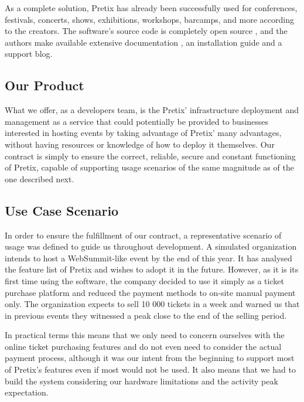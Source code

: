 \documentclass[12pt]{article}
\begin{document}
As a complete solution, Pretix has already been successfully used for conferences, festivals, concerts, shows, exhibitions, workshops, barcamps, and more 
according to the creators.
The software's source code is completely open source \cite{pretixgit}, and the authors make available extensive documentation \cite{pretixdoc}, an installation 
guide and a support blog.

\subsection{Our Product} \label{pretix.product} %


What we offer, as a developers team, is the Pretix' infrastructure deployment and management as a service that could potentially be provided to businesses 
interested in hosting events by taking advantage of Pretix' many advantages, without having resources or knowledge of how to deploy it themselves.
Our contract is simply to ensure the correct, reliable, secure and constant functioning of Pretix, capable of supporting usage scenarios of the same magnitude 
as of the one described next.

\subsection{Use Case Scenario} \label{pretix.scenario} %


In order to ensure the fulfillment of our contract, a representative scenario of usage was defined to guide us throughout development.
A simulated organization intends to host a WebSummit-like event by the end of this year.
It has analysed the feature list of Pretix and wishes to adopt it in the future.
However, as it is its first time using the software, the company decided to use it simply as a ticket purchase platform and reduced the payment methods to 
on-site manual payment only. %
The organization expects to sell 10 000 tickets in a week and warned us that in previous events they witnessed a peak close to the end of the selling period.

In practical terms this means that we only need to concern ourselves with the online ticket purchasing features and do not even need to consider the actual 
payment process, although it was our intent from the beginning to support most of Pretix's features even if most would not be used.
It also means that we had to build the system considering our hardware limitations and the activity peak expectation.
\end{document}
